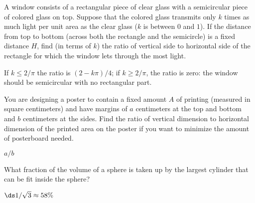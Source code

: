 \begin{enumialphparenastyle}
\begin{ex}
 A window consists of a rectangular piece of clear glass with
a semicircular piece of colored glass on top.  Suppose that the
colored glass transmits only $k$ times as much light per unit area as
the clear glass ($k$ is between $0$ and $1$).  If the distance from
top to bottom (across both the rectangle and the semicircle) is a
fixed distance $H$,
find (in terms of $k$) the ratio of vertical side to horizontal side
of the rectangle for which the window lets through the most light.
\begin{sol}
 If $k\le 2/\pi$ the ratio is $(2-k\pi)/4$; if $k\ge 2/\pi$,
the ratio is zero: the window should be semicircular with no
rectangular part.
\end{sol}
\end{ex}

\begin{ex}
 You are designing a poster to contain a fixed amount $A$ of
printing (measured in square centimeters) and have margins of $a$
centimeters at the top and bottom and $b$ centimeters at the sides.
Find the ratio of vertical dimension to horizontal dimension of the
printed area on the poster if you want to minimize the amount of
posterboard needed.
\begin{sol}
 $a/b$
\end{sol}
\end{ex}

%



\begin{ex}
What fraction of the volume of a sphere is taken up by the largest cylinder
that can be fit inside the sphere?
\begin{sol}
 $\ds 1/\sqrt3\approx 58\%$
\end{sol}
\end{ex}


\end{enumialphparenastyle}
